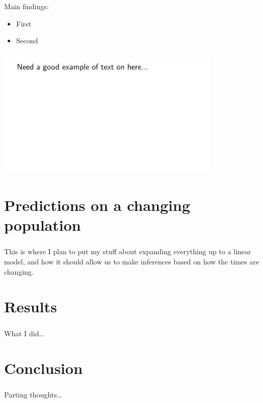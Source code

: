 \documentclass[aspectratio=169]{beamer}
\begin{document}
\begin{frame} \frametitle{\insertsection}

    Main findings:
    \begin{itemize}
        \item First
        \item Second
    \end{itemize}

\end{frame}

\begin{frame} \frametitle{\insertsection}
    \centering\includegraphics[width=0.8\textwidth]{images/example}
\end{frame}

\section{Predictions on a changing population}

\begin{frame} \frametitle{\insertsection}

    This is where I plan to put my stuff about
    expanding everything up to a linear model,
    and how it should allow us to make inferences
    based on how the times are changing.

\end{frame}

\section{Results}

\begin{frame} \frametitle{\insertsection}

    What I did\ldots

\end{frame}

\section{Conclusion}

\begin{frame} \frametitle{\insertsection}

    Parting thoughts\ldots

\end{frame}
\end{document}
